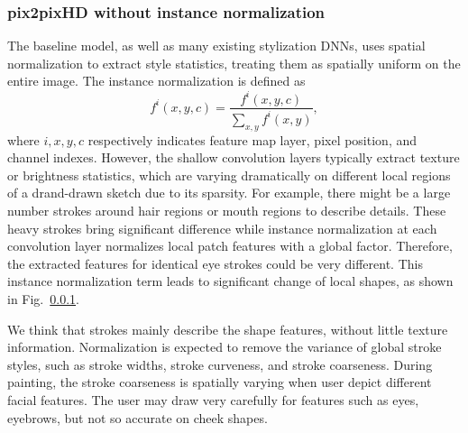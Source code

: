 \subsubsection{pix2pixHD without instance normalization}
The baseline model, as well as many existing stylization DNNs, uses spatial normalization  to extract style statistics, treating them as spatially uniform on the entire image. 
The instance normalization is defined as
\begin{equation}\label{eq:instance-norm}
f^i(x,y,c)=\frac{f^i(x,y,c)}{\sum_{x,y}f^i(x,y)},
\end{equation}
where $i, x,y,c$ respectively indicates feature map layer, pixel position, and channel indexes.  
However, the shallow convolution layers typically extract texture or brightness statistics, which are varying dramatically on different local regions of a drand-drawn sketch due to its sparsity. For example, there might be a large number strokes around hair regions or mouth regions to describe details. These heavy strokes bring significant difference while instance normalization at each convolution layer normalizes local patch features with a global factor. Therefore, the extracted features for identical eye strokes could be very different. 
This instance normalization term leads to significant change of local shapes, as shown in Fig.~\ref{}.


We think that strokes mainly describe the shape features, without little texture information. Normalization is expected to remove the variance of global stroke styles, such as stroke widths, stroke curveness, and stroke coarseness. 
During painting, the stroke coarseness is spatially varying when user depict different facial features. 
The user may draw very carefully for features such as eyes, eyebrows, but not so accurate on cheek shapes. 
